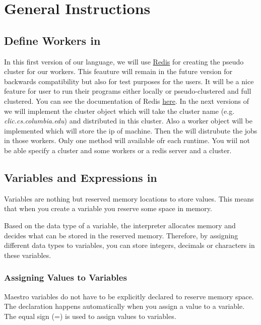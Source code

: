 \section{General Instructions}
\label{sect:general}

\subsection*{Define Workers in \lang{}}
In this first version of our \lang{} language, we will use \href{http://www.redis.io}{Redis}
for creating the pseudo cluster for our workers. This feauture will remain in the future version for backwards compatibility but also for test purposes for the users.
It will be a nice feature for user to run their \lang{} programs either locally or pseudo-clustered and full clustered.
You can see the documentation of Redis \href{http://redis.io/documentation}{here}.
In the next versions of \lang{} we will implement the cluster object which will take the cluster name (e.g. \textit{clic.cs.columbia.edu}) and distributed in this cluster.
Also a worker object will be implemented which will store the ip of machine. Then the \lang{} will distrubute the jobs in those workers.
Only one method will available ofr each runtime. You wiil not be able specify a cluster and some workers or a redis server and a cluster.

\subsection*{Variables and Expressions in \lang{}}
Variables are nothing but reserved memory locations to store values. This means that when you create a variable you reserve some space in memory.

Based on the data type of a variable, the interpreter allocates memory and decides what can be stored in the reserved memory. Therefore, by assigning different data types to variables, you can store integers, decimals or characters in these variables.

\subsubsection*{Assigning Values to Variables}

Maestro variables do not have to be explicitly declared to reserve memory space. The declaration happens automatically when you assign a value to a variable. The equal sign (=) is used to assign values to variables.


